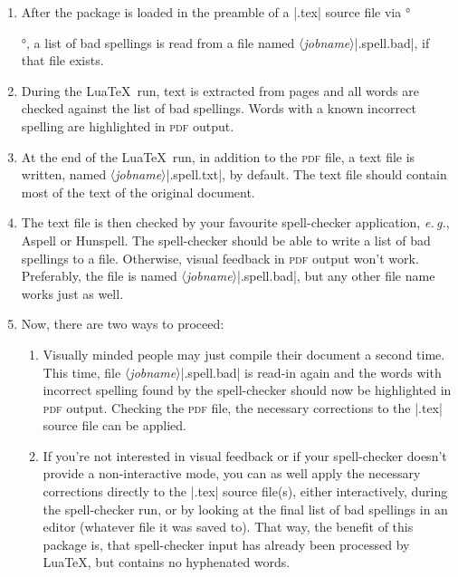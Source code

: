 \documentclass[11pt]{article}
\newcommand*{\acr}[1]{\mbox{\scshape#1}}
\newcommand*{\descr}[1]{〈\emph{#1}〉}
\newcommand*{\latinphrase}[1]{\foreignlanguage{latin}{\emph{#1}}}
\newcommand*{\lpeg}{\latinphrase{e.\,g.}\xspace}
\begin{document}
\begin{enumerate}

\item After the package is loaded in the preamble of a |.tex| source
  file via °\usepackage{spelling}°, a list of bad spellings is read from
  a file named \descr{jobname}|.spell.bad|, if that file exists.

\item During the Lua\TeX\ run, text is extracted from pages and all
  words are checked against the list of bad spellings.  Words with a
  known incorrect spelling are highlighted in \acr{pdf} output.

\item At the end of the Lua\TeX\ run, in addition to the \acr{pdf} file,
  a text file is written, named \descr{jobname}|.spell.txt|, by default.
  The text file should contain most of the text of the original
  document.

\item The text file is then checked by your favourite spell-checker
  application, \lpeg, Aspell or Hunspell.  The spell-checker should be
  able to write a list of bad spellings to a file.  Otherwise, visual
  feedback in \acr{pdf} output won't work.  Preferably, the file is
  named \descr{jobname}|.spell.bad|, but any other file name works just
  as well.

\item Now, there are two ways to proceed:

  \begin{enumerate}

  \item Visually minded people may just compile their document a second
    time.  This time, file \descr{jobname}|.spell.bad| is read-in again
    and the words with incorrect spelling found by the spell-checker
    should now be highlighted in \acr{pdf} output.  Checking the
    \acr{pdf} file, the necessary corrections to the |.tex| source file
    can be applied.

  \item If you're not interested in visual feedback or if your
    spell-checker doesn't provide a non-interactive mode, you can as
    well apply the necessary corrections directly to the |.tex| source
    file(s), either interactively, during the spell-checker run, or by
    looking at the final list of bad spellings in an editor (whatever
    file it was saved to).  That way, the benefit of this package is,
    that spell-checker input has already been processed by Lua\TeX, but
    contains no hyphenated words.

  \end{enumerate}

\end{enumerate}
\end{document}
